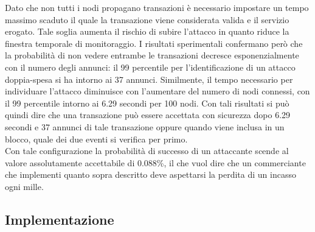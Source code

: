 Dato che non tutti i nodi propagano transazioni è necessario impostare un tempo massimo scaduto il quale la transazione viene considerata valida e il servizio erogato. Tale soglia aumenta il rischio di subire l'attacco in quanto riduce la finestra temporale di monitoraggio. I risultati sperimentali confermano però che la probabilità di non vedere entrambe le transazioni decresce esponenzialmente con il numero degli annunci: il 99 percentile per l'identificazione di un attacco doppia-spesa si ha intorno ai 37 annunci. Similmente, il tempo necessario per individuare l'attacco diminuisce con l'aumentare del numero di nodi connessi, con il 99 percentile intorno ai 6.29 secondi per 100 nodi. Con tali risultati si può quindi dire che una transazione può essere accettata con sicurezza dopo 6.29 secondi e 37 annunci di tale transazione oppure quando viene inclusa in un blocco, quale dei due eventi si verifica per primo.\\
Con tale configurazione la probabilità di successo di un attaccante scende al valore assolutamente accettabile di 0.088\%, il che vuol dire che un commerciante che implementi quanto sopra descritto deve aspettarsi la perdita di un incasso ogni mille.

\subsection{Implementazione}

